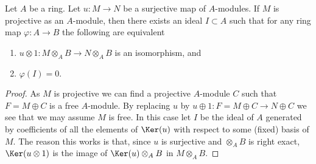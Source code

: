 \begin{lemma}
\label{lemma-flattening-module-map}
Let $A$ be a ring. Let $u : M \to N$ be a surjective map of $A$-modules.
If $M$ is projective as an $A$-module, then there exists an ideal
$I \subset A$ such that for any ring map $\varphi : A \to B$
the following are equivalent
\begin{enumerate}
\item $u \otimes 1 : M \otimes_A B \to N \otimes_A B$ is an
isomorphism, and
\item $\varphi(I) = 0$.
\end{enumerate}
\end{lemma}

\begin{proof}
As $M$ is projective we can find a projective $A$-module $C$
such that $F = M \oplus C$ is a free $A$-module.
By replacing $u$ by $u \oplus 1 : F = M \oplus C \to N \oplus C$
we see that we may assume $M$ is free. In this case let $I$ be
the ideal of $A$ generated by coefficients of all the elements of
$\Ker(u)$ with respect to some (fixed) basis of $M$.
The reason this works is that, since $u$ is surjective and
$\otimes_A B$ is right exact, $\Ker(u \otimes 1)$ is
the image of $\Ker(u) \otimes_A B$ in $M \otimes_A B$.
\end{proof}
